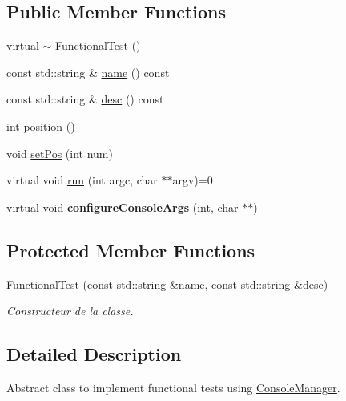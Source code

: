 \subsection*{Public Member Functions}
\begin{DoxyCompactItemize}
\item 
virtual \hyperlink{classFunctionalTest_ab3207865c4ba2087ae1611ca92da07d7}{$\sim$ Functional\+Test} ()
\item 
const std\+::string \& \hyperlink{classFunctionalTest_ae40fb49a44014898c3b647e96a485922}{name} () const
\item 
const std\+::string \& \hyperlink{classFunctionalTest_a7b310fa513c607660bf445cc36959eac}{desc} () const
\item 
int \hyperlink{classFunctionalTest_ad12ed2cc723ce1584ff0a5c7dcddcf5e}{position} ()
\item 
void \hyperlink{classFunctionalTest_add2d19aff8e1754df1f6775abad4b98e}{set\+Pos} (int num)
\item 
virtual void \hyperlink{classFunctionalTest_a9942d82ed217f8410935d88cd70f64c5}{run} (int argc, char $\ast$$\ast$argv)=0
\item 
\mbox{\label{classFunctionalTest_ab883801a3de94eb67111f92f494c6aa7}} 
virtual void {\bfseries configure\+Console\+Args} (int, char $\ast$$\ast$)
\end{DoxyCompactItemize}
\subsection*{Protected Member Functions}
\begin{DoxyCompactItemize}
\item 
\hyperlink{classFunctionalTest_a2a6a15ddfbeb221b6eedc486138504c3}{Functional\+Test} (const std\+::string \&\hyperlink{classFunctionalTest_ae40fb49a44014898c3b647e96a485922}{name}, const std\+::string \&\hyperlink{classFunctionalTest_a7b310fa513c607660bf445cc36959eac}{desc})
\begin{DoxyCompactList}\small\item\em Constructeur de la classe. \end{DoxyCompactList}\end{DoxyCompactItemize}


\subsection{Detailed Description}
Abstract class to implement functional tests using \hyperlink{classConsoleManager}{Console\+Manager}. 

